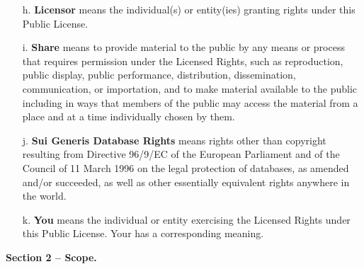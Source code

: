 \begin{enumerate}
	\item[h.]
	\textbf{Licensor} means the individual(s) or entity(ies) granting rights
	under this Public License.

	\item[i.]
	\textbf{Share} means to provide material to the public by any means or
	process that requires permission under the Licensed Rights, such
	as reproduction, public display, public performance, distribution,
	dissemination, communication, or importation, and to make material
	available to the public including in ways that members of the
	public may access the material from a place and at a time
	individually chosen by them.

	\item[j.]
	\textbf{Sui Generis Database Rights} means rights other than copyright
	resulting from Directive 96/9/EC of the European Parliament and of
	the Council of 11 March 1996 on the legal protection of databases,
	as amended and/or succeeded, as well as other essentially
	equivalent rights anywhere in the world.

	\item[k.]
	\textbf{You} means the individual or entity exercising the Licensed Rights
	under this Public License. Your has a corresponding meaning.

\end{enumerate}


\textbf{Section 2 -- Scope.}

